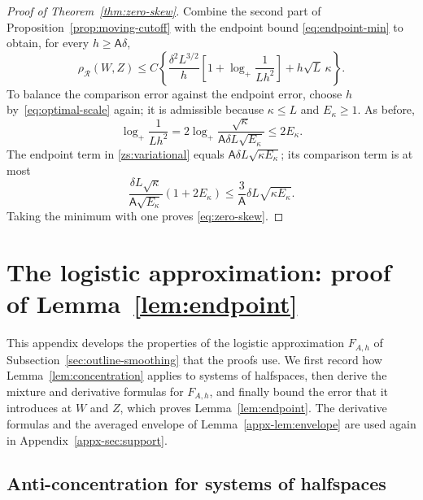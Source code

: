 \documentclass[11pt,letterpaper]{article}
\newif\ifshowrev
\newcommand{\rev}[1]{\ifshowrev{\color{revblue}%
\hypersetup{linkcolor=revblue,citecolor=revblue,urlcolor=revblue}#1}\else#1\fi}
\newcommand{\rs}[1]{\ifshowrev{\color{revblue}#1}\else#1\fi}
\newcommand{\Ac}{\rs{\mathsf A}}
\newif\ifshowtrim
\newcommand{\trim}[1]{\ifshowtrim{\color{revblue}%
\hypersetup{linkcolor=revblue,citecolor=revblue,urlcolor=revblue}#1}\else#1\fi}
\newcommand{\trs}[1]{\ifshowtrim{\color{revblue}#1}\else#1\fi}
\theoremstyle{remark}
\newcommand{\rh}{\rho_{\mathcal R}}
\begin{document}
\begin{proof}[Proof of Theorem~\ref{thm:zero-skew}]
Combine \rev{the second part of} Proposition~\rev{\ref{prop:moving-cutoff}} with the endpoint
bound \eqref{eq:endpoint-min} to obtain, for every \(h\ge\Ac\delta\),
\begin{equation}
 \rh(W,Z)\le C\left\{
 \frac{\delta^2L^{3/2}}h
 \left[1+\log_+\frac1{Lh^2}\right]+h\sqrt L\,\kappa\right\}.
 \label{zs:variational}
\end{equation}
To balance the comparison error against the endpoint error, choose
\trim{\(h\) by}~\eqref{eq:optimal-scale} again\trim{; it} is admissible because \(\kappa\le L\) and \(E_\kappa\ge1\).
As before,
\[
 \log_+\frac1{Lh^2}
 =2\log_+\frac{\sqrt\kappa}{\Ac\delta L\sqrt{E_\kappa}}
 \le2E_\kappa.
\]
The endpoint term in \eqref{zs:variational} equals
\(\Ac\delta L\sqrt{\kappa E_\kappa}\); its comparison term is at most
\[
 \frac{\delta L\sqrt\kappa}{\Ac\sqrt{E_\kappa}}(1+2E_\kappa)
 \le\frac3{\Ac}\delta L\sqrt{\kappa E_\kappa}.
\]
Taking the minimum with one proves \eqref{eq:zero-skew}.

\end{proof}


\section{\texorpdfstring{\trs{The logistic approximation: proof of Lemma~\ref{lem:endpoint}}}{The logistic approximation: proof of Lemma 2}}\label{appx-sec:smoothing}

\trim{This appendix develops the properties of the logistic
approximation \(F_{A,h}\) of Subsection~\ref{sec:outline-smoothing} that
the proofs use. We first record how Lemma~\ref{lem:concentration}
applies to systems of halfspaces, then derive the mixture and derivative
formulas for \(F_{A,h}\), and finally bound the error that it introduces
at \(W\) and \(Z\)\trim{, which proves Lemma~\ref{lem:endpoint}. The
derivative formulas and the averaged envelope of
Lemma~\ref{appx-lem:envelope} are used again in
Appendix~\ref{appx-sec:support}}.}

\subsection{\texorpdfstring{\trs{Anti-concentration for systems of halfspaces}}{Anti-concentration for systems of halfspaces}}
\end{document}
